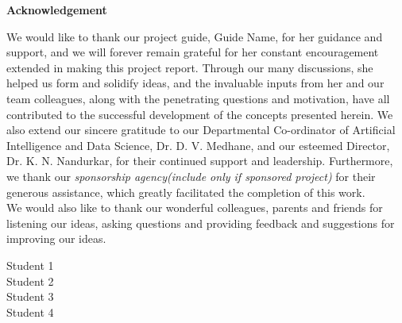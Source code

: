 \begin{center}
\bfseries \fontsize{24}{12} \selectfont Acknowledgement
\end{center}
\vspace*{1\baselineskip}
\hspace*{0.5in}We would like to thank our project guide, Guide Name, for her guidance and support, and we will forever remain grateful for her constant encouragement extended in making this project report. Through our many discussions, she helped us form and solidify ideas, and the invaluable inputs from her and our team colleagues, along with the penetrating questions and motivation, have all contributed to the successful development of the concepts presented herein. We also extend our sincere gratitude to our Departmental Co-ordinator of Artificial Intelligence and Data Science, Dr. D. V. Medhane, and our esteemed Director, Dr. K. N. Nandurkar, for their continued support and leadership. Furthermore, we thank our \textit{sponsorship agency(include only if sponsored project)} for their generous assistance, which greatly facilitated the completion of this work.\\

\hspace*{0.3in}We would also like to thank our wonderful colleagues, parents and friends for listening our ideas, asking questions  and providing feedback and suggestions for improving our ideas.\\

\vspace*{3\baselineskip} 
\begin{flushright}
Student 1 \\
Student 2 \\
Student 3 \\
Student 4 \\
\end{flushright}
